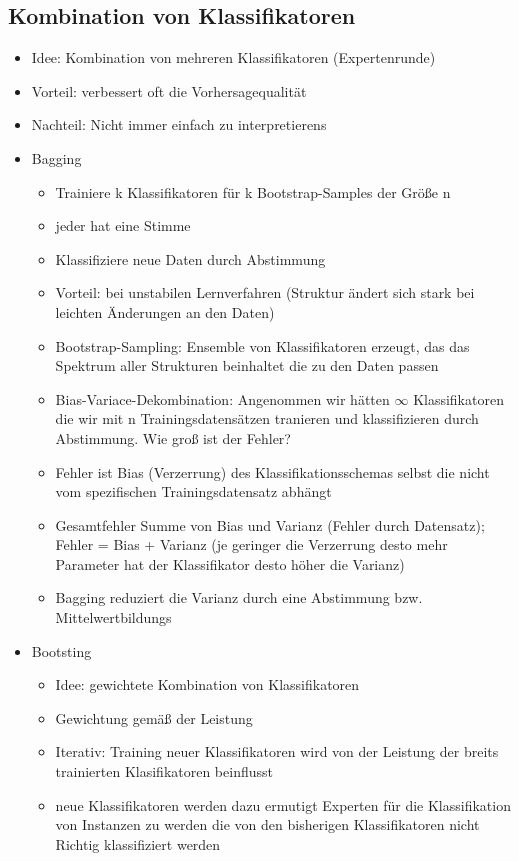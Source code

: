 \documentclass{article} %
\begin{document}
	\subsection{Kombination von Klassifikatoren}
	\begin{itemize}
		\item Idee: Kombination von mehreren Klassifikatoren (Expertenrunde)
		\item Vorteil: verbessert oft die Vorhersagequalität
		\item Nachteil: Nicht immer einfach zu interpretierens
		\item Bagging
		\begin{itemize}
			\item Trainiere k Klassifikatoren für k Bootstrap-Samples der Größe n
			\item jeder hat eine Stimme
			\item Klassifiziere neue Daten durch Abstimmung
			\item Vorteil: bei unstabilen Lernverfahren (Struktur ändert sich stark bei leichten Änderungen an den Daten)
			\item Bootstrap-Sampling: Ensemble von Klassifikatoren erzeugt, das das Spektrum aller Strukturen beinhaltet die zu den Daten passen
			\item Bias-Variace-Dekombination: Angenommen wir hätten $\infty$ Klassifikatoren die wir mit n Trainingsdatensätzen tranieren und klassifizieren durch Abstimmung. Wie groß ist der Fehler?
			\item Fehler ist Bias (Verzerrung) des Klassifikationsschemas selbst die nicht vom spezifischen Trainingsdatensatz abhängt
			\item Gesamtfehler Summe von Bias und Varianz (Fehler durch Datensatz); Fehler = Bias + Varianz (je geringer die Verzerrung desto mehr Parameter hat der Klassifikator desto höher die Varianz)
			\item Bagging reduziert die Varianz durch eine Abstimmung bzw. Mittelwertbildungs
		\end{itemize}
		\item Bootsting
		\begin{itemize}
			\item Idee: gewichtete Kombination von Klassifikatoren
			\item Gewichtung gemäß der Leistung
			\item Iterativ: Training neuer Klassifikatoren wird von der Leistung der breits trainierten Klasifikatoren beinflusst
			\item neue Klassifikatoren werden dazu ermutigt Experten für die Klassifikation von Instanzen zu werden die von den bisherigen Klassifikatoren nicht Richtig klassifiziert werden

\end{itemize}
\end{itemize}
\end{document}

